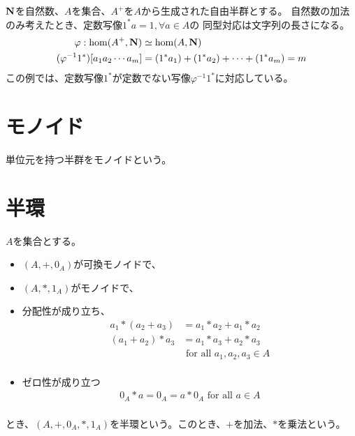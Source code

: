 	\begin{example}[文字列の長さ]\label{obs:文字列の長さ} %
		${\mathbf{N}}$を自然数、$A$を集合、$A^+$を$A$から生成された自由半群とする。
		自然数の加法のみ考えたとき、定数写像$1^*a=1,\forall a\in A$の
		同型対応は文字列の長さになる。
		\begin{equation*}\begin{split} %
			\varphi: \hom(A^+,\mybf{N}) &\simeq \hom(A,\mybf{N}) \\
			(\varphi^{-1}1^*)[a_1a_2\cdots a_m] &= (1^*a_1)+(1^*a_2)+\cdots+(1^*a_m) = m \\
		\end{split}\end{equation*} %
		この例では、定数写像$1^*$が定数でない写像$\varphi^{-1}1^*$に対応している。
	\end{example} %


\section{モノイド}\label{s1:モノイド} %
	\begin{definition}[モノイド]\label{def:モノイド} %
		単位元を持つ半群をモノイドという。
	\end{definition} %

\section{半環}\label{s1:半環} %
	\begin{definition}[半環]\label{def:半環} %
		$A$を集合とする。
		\begin{itemize}
			\item $(A,+,0_A)$が可換モノイドで、
			\item $(A,*,1_A)$がモノイドで、
			\item 分配性が成り立ち、
			\begin{equation*}\begin{split} %
				a_1*(a_2+a_3) &= a_1*a_2+a_1*a_2 \\
				(a_1+a_2)*a_3 &= a_1*a_3+a_2*a_3 \\
				& \text{ for all }a_1,a_2,a_3 \in A \\
			\end{split}\end{equation*} %
			\item ゼロ性が成り立つ
			\begin{equation*}\begin{split} %
				0_A*a = 0_A = a*0_A \text{ for all }a\in A \\
			\end{split}\end{equation*} %
		\end{itemize}
		とき、$(A,+,0_A,*,1_A)$を半環という。このとき、$+$を加法、$*$を乗法という。
	\end{definition} %

